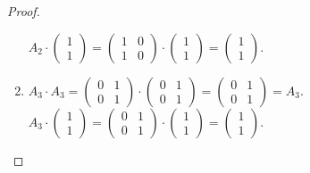 \documentclass{article}
\begin{document}
\begin{proof}
\begin{enumerate}
            $A_2 \cdot \begin{pmatrix} 1\\1\end{pmatrix} = \begin{pmatrix}1&0\\1&0\end{pmatrix} \cdot \begin{pmatrix}1\\1\end{pmatrix} = \begin{pmatrix}1\\1\end{pmatrix}$.
            \item $A_3 \cdot A_3 = \begin{pmatrix}0&1\\0&1\end{pmatrix} \cdot \begin{pmatrix}0&1\\0&1\end{pmatrix} = \begin{pmatrix}0&1\\0&1\end{pmatrix} = A_3$.\\
            $A_3 \cdot \begin{pmatrix} 1\\1\end{pmatrix} = \begin{pmatrix}0&1\\0&1\end{pmatrix} \cdot \begin{pmatrix}1\\1\end{pmatrix} = \begin{pmatrix}1\\1\end{pmatrix}$.
        \end{enumerate}
    \end{proof}
\end{document}
